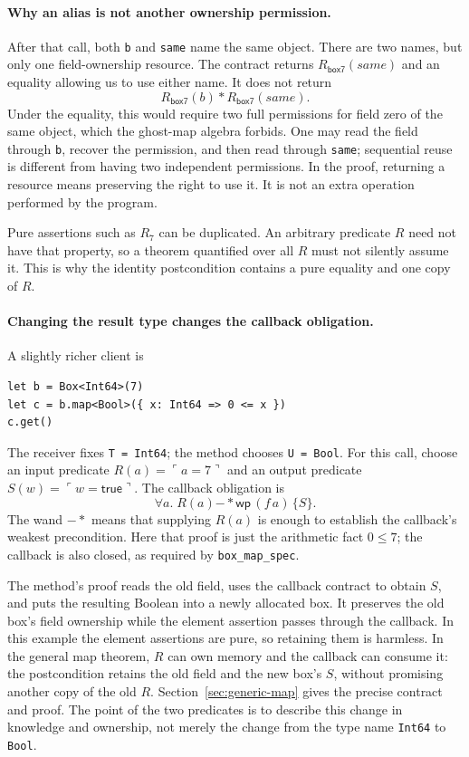 \documentclass[11pt]{article}
\newcommand{\sep}{\mathbin{*}}
\newcommand{\wand}{\mathbin{-\!\!*}}
\newcommand{\Wpre}{\mathsf{wp}}
\newcommand{\pure}[1]{\ulcorner #1 \urcorner}
\begin{document}
\paragraph{Why an alias is not another ownership permission.}
After that call, both \texttt{b} and \texttt{same} name the same object.
There are two names, but only one field-ownership resource. The contract
returns \(R_{\mathsf{box7}}(\mathit{same})\) and an equality allowing
us to use either name. It does not return
\[
R_{\mathsf{box7}}(b)\sep R_{\mathsf{box7}}(\mathit{same}).
\]
Under the equality, this would require two full permissions for field zero
of the same object, which the ghost-map algebra forbids. One may read the
field through \texttt{b}, recover the permission, and then read through
\texttt{same}; sequential reuse is different from having two independent
permissions. In the proof, returning a resource means preserving the
right to use it. It is not an extra operation performed by the program.

Pure assertions such as \(R_7\) can be duplicated. An arbitrary
predicate \(R\) need not have that property, so a theorem quantified
over all \(R\) must not silently assume it. This is why the identity
postcondition contains a pure equality and one copy of \(R\).

\paragraph{Changing the result type changes the callback obligation.}
A slightly richer client is
\begin{lstlisting}
let b = Box<Int64>(7)
let c = b.map<Bool>({ x: Int64 => 0 <= x })
c.get()
\end{lstlisting}
The receiver fixes \texttt{T = Int64}; the method chooses
\texttt{U = Bool}. For this call, choose an input predicate
\(R(a)=\pure{a=7}\) and an output predicate
\(S(w)=\pure{w=\mathsf{true}}\). The callback obligation is
\[
\forall a.\;R(a)\wand\Wpre\,(f\,a)\,\{S\}.
\]
The wand \(\wand\) means that supplying \(R(a)\) is enough to
establish the callback's weakest precondition. Here that proof is just
the arithmetic fact \(0\leq7\); the callback is also closed, as
required by \texttt{box\_map\_spec}.

The method's proof reads the old field, uses the callback contract to
obtain \(S\), and puts the resulting Boolean into a newly allocated
box. It preserves the old box's field ownership while the element
assertion passes through the callback. In this example the element
assertions are pure, so retaining them is harmless. In the general map
theorem, \(R\) can own memory and the callback can consume it: the
postcondition retains the old field and the new box's \(S\), without
promising another copy of the old \(R\). Section~\ref{sec:generic-map}
gives the precise contract and proof. The point of the two predicates is
to describe this change in knowledge and ownership, not merely the change
from the type name \texttt{Int64} to \texttt{Bool}.
\end{document}
